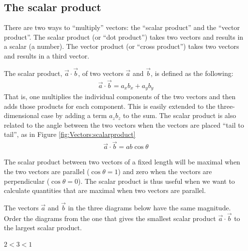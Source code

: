 

\subsection{The scalar product}\label{sec:Vectors:scalarproduct}
There are two ways to ``multiply'' vectors: the ``scalar product'' and the ``vector product''. The scalar product (or ``dot product'') takes two vectors and results in a scalar (a number). The vector product (or ``cross product'') takes two vectors and results in a third vector. 

The scalar product, $\vec a \cdot \vec b$, of two vectors $\vec a$ and $\vec b$, is defined as the following:
\begin{align*}
\vec a \cdot \vec b=a_xb_x +a_yb_y
\end{align*}
That is, one multiplies the individual components of the two vectors and then adds those products for each component. This is easily extended to the three-dimensional case by adding a term $a_zb_z$ to the sum. The scalar product is also related to the angle between the two vectors when the vectors are placed ``tail to tail'', as in Figure \ref{fig:Vectors:scalarproduct}
\begin{align*}
\vec a \cdot \vec b= ab\cos\theta
\end{align*}


The scalar product between two vectors of a fixed length will be maximal when the two vectors are parallel ($\cos\theta=1$) and zero when the vectors are perpendicular ($\cos\theta =0$). The scalar product is thus useful when we want to calculate quantities that are maximal when two vectors are parallel. 

\begin{checkpoint}
The vectors $\vec a $ and $\vec b$ in the three diagrams below have the same magnitude. Order the diagrams from the one that gives the smallest scalar product $\vec a\cdot \vec b$ to the largest scalar product.
\begin{answer}
$2<3<1$
\end{answer}
\end{checkpoint}


